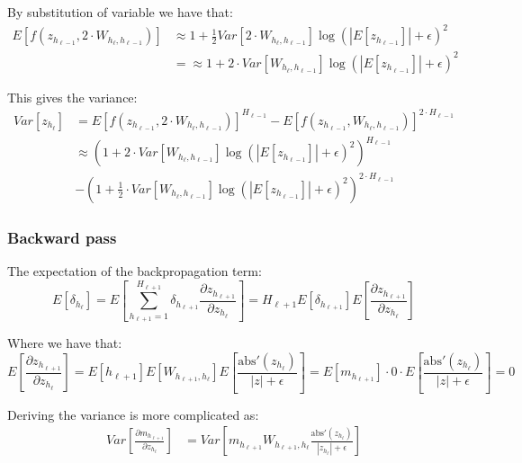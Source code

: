 By substitution of variable we have that:
\begin{equation}
\begin{aligned}
E\left[f(z_{h_{\ell-1}}, 2 \cdot W_{h_{\ell}, h_{\ell-1}})\right] &\approx 1 + \frac{1}{2} Var[2 \cdot W_{h_{\ell}, h_{\ell-1}}] \log(|E[z_{h_{\ell-1}}]| + \epsilon)^2 \\
&= \approx 1 + 2 \cdot Var[W_{h_{\ell}, h_{\ell-1}}] \log(|E[z_{h_{\ell-1}}]| + \epsilon)^2
\end{aligned}
\end{equation}

This gives the variance:
\begin{equation}
\begin{aligned}
Var[z_{h_\ell}] &= E\left[f(z_{h_{\ell-1}}, 2 \cdot W_{h_{\ell}, h_{\ell-1}}) \right]^{H_{\ell-1}}
- E\left[f(z_{h_{\ell-1}}, W_{h_{\ell}, h_{\ell-1}})\right]^{2\cdot H_{\ell-1}} \\
&\approx \left(1 + 2 \cdot Var[W_{h_{\ell}, h_{\ell-1}}] \log(|E[z_{h_{\ell-1}}]| + \epsilon)^2\right)^{H_{\ell-1}} \\
&- \left(1 + \frac{1}{2} \cdot Var[W_{h_{\ell}, h_{\ell-1}}] \log(|E[z_{h_{\ell-1}}]| + \epsilon)^2\right)^{2\cdot H_{\ell-1}}
\end{aligned}
\end{equation}

\subsubsection{Backward pass}
The expectation of the backpropagation term:
\begin{equation}
E[\delta_{h_\ell}] = E\left[\sum_{h_{\ell+1}=1}^{H_{\ell+1}} \delta_{h_{\ell+1}} \frac{\partial z_{h_{\ell+1}}}{\partial z_{h_\ell}}\right] = H_{\ell+1} E[\delta_{h_{\ell+1}}] E\left[\frac{\partial z_{h_{\ell+1}}}{\partial z_{h_\ell}}\right]
\end{equation}

Where we have that:
\begin{equation}
E\left[\frac{\partial z_{h_{\ell+1}}}{\partial z_{h_\ell}}\right] = E[{h_{\ell+1}}] E[W_{h_{\ell+1}, h_{\ell}}] E\left[ \frac{\mathrm{abs}'(z_{h_{\ell}})}{|z| + \epsilon}\right] = E[m_{h_{\ell+1}}] \cdot 0 \cdot E\left[ \frac{\mathrm{abs}'(z_{h_{\ell}})}{|z| + \epsilon}\right] = 0
\end{equation}

Deriving the variance is more complicated as:
\begin{equation}
\begin{aligned}
Var\left[\frac{\partial m_{h_{\ell+1}}}{\partial z_{h_\ell}}\right] &= Var\left[m_{h_{\ell+1}} W_{h_{\ell+1}, h_{\ell}} \frac{\mathrm{abs}'(z_{h_{\ell}})}{|z_{h_{\ell}}| + \epsilon}\right]
\end{aligned}
\end{equation}

